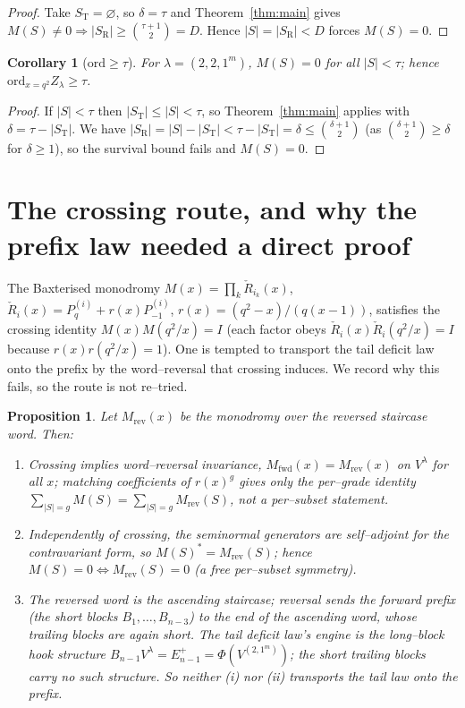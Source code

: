 \documentclass[11pt]{article}
\newtheorem{proposition}[theorem]{Proposition}
\newtheorem{corollary}[theorem]{Corollary}
\theoremstyle{definition}
\newcommand{\Vlam}{V^\lambda}
\newcommand{\Ep}[1]{E^{+}_{#1}}
\newcommand{\Pq}{P_{q}}
\newcommand{\Pm}{P_{-1}}
\newcommand{\St}{S_{\mathrm T}}
\newcommand{\Sr}{S_{\mathrm R}}
\begin{document}
\begin{proof}
Take $\St=\varnothing$, so $\delta=\tau$ and Theorem~\ref{thm:main} gives
$M(S)\neq0\Rightarrow|\Sr|\ge\binom{\tau+1}{2}=D$. Hence $|S|=|\Sr|<D$ forces $M(S)=0$.
\end{proof}

\begin{corollary}[$\mathrm{ord}\ge\tau$]\label{cor:ordertau}
For $\lambda=(2,2,1^m)$, $M(S)=0$ for all $|S|<\tau$; hence
$\mathrm{ord}_{x=q^2}Z_\lambda\ge\tau$.
\end{corollary}

\begin{proof}
If $|S|<\tau$ then $|\St|\le|S|<\tau$, so Theorem~\ref{thm:main} applies with
$\delta=\tau-|\St|$. We have $|\Sr|=|S|-|\St|<\tau-|\St|=\delta\le\binom{\delta+1}{2}$ (as
$\binom{\delta+1}{2}\ge\delta$ for $\delta\ge1$), so the survival bound fails and $M(S)=0$.
\end{proof}

\section{The crossing route, and why the prefix law needed a direct proof}\label{sec:crossing}

The Baxterised monodromy $M(x)=\prod_k\check R_{i_k}(x)$, $\check
R_i(x)=\Pq^{(i)}+r(x)\Pm^{(i)}$, $r(x)=(q^2-x)/(q(x-1))$, satisfies the crossing identity
$M(x)M(q^2/x)=I$ (each factor obeys $\check R_i(x)\check R_i(q^2/x)=I$ because
$r(x)r(q^2/x)=1$). One is tempted to transport the tail deficit law onto the prefix by the
word--reversal that crossing induces. We record why this fails, so the route is not re--tried.

\begin{proposition}\label{prop:crossing}
Let $M_{\mathrm{rev}}(x)$ be the monodromy over the reversed staircase word. Then:
\begin{enumerate}[topsep=0.2em,itemsep=0.1em,label=\textup{(\roman*)}]
\item Crossing implies word--reversal invariance, $M_{\mathrm{fwd}}(x)=M_{\mathrm{rev}}(x)$ on
$\Vlam$ for all $x$; matching coefficients of $r(x)^g$ gives only the per--grade identity
$\sum_{|S|=g}M(S)=\sum_{|S|=g}M_{\mathrm{rev}}(S)$, not a per--subset statement.
\item Independently of crossing, the seminormal generators are self--adjoint for the
contravariant form, so $M(S)^{*}=M_{\mathrm{rev}}(S)$; hence $M(S)=0\iff M_{\mathrm{rev}}(S)=0$
(a free per--subset symmetry).
\item The reversed word is the \emph{ascending} staircase; reversal sends the forward prefix
(the \emph{short} blocks $B_1,\dots,B_{n-3}$) to the \emph{end} of the ascending word, whose
trailing blocks are again short. The tail deficit law's engine is the \emph{long}--block hook
structure $B_{n-1}\Vlam=\Ep{n-1}=\Phi(V^{(2,1^m)})$; the short trailing blocks carry no such
structure. So neither \textup{(i)} nor \textup{(ii)} transports the tail law onto the prefix.
\end{enumerate}
\end{proposition}
\end{document}
